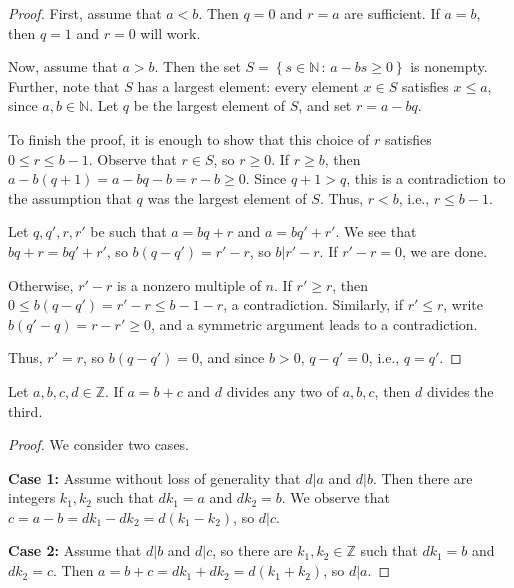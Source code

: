 \documentclass[english,course]{lecture}
\renewcommand{\le}{\leqslant}
\renewcommand{\ge}{\geqslant}
\theoremstyle{plain}
\def\setof#1#2{{\left\{#1\,\colon\,#2\right\}}}
\def\Z{{\mathbb Z}}
\def\N{{\mathbb N}}
\def\presnotes{}
\begin{document}
\begin{proof}
First, assume that $a < b$.
	Then $q = 0$ and $r = a$ are sufficient.
	If $a = b$, then $q = 1$ and $r = 0$ will work.
	
	Now, assume that $a > b$.
	Then the set $S = \setof{s\in\N}{a-bs \ge 0}$ is nonempty.
	Further, note that $S$ has a largest element: every element $x\in S$ satisfies $x \le a$, since $a,b\in\N$.
	Let $q$ be the largest element of $S$, and set $r = a - bq$.
	
	To finish the proof, it is enough to show that this choice of $r$ satisfies $0\le r \le b-1$.
	Observe that $r\in S$, so $r\ge 0$.
	If $r \ge b$, then $a - b(q+1) = a-bq -b = r -b \ge 0$.
	Since $q+1 > q$, this is a contradiction to the assumption that $q$ was the largest element of $S$.
	Thus, $r < b$, i.e., $r \le b-1$.
	
	\medskip
	
	Let $q,q',r,r'$ be such that $a = bq+r$ and $a=bq'+r'$.
	We see that $bq+r = bq' + r'$, so $b(q-q') = r'-r$, so $b|r'-r$.
	If $r'-r = 0$, we are done.
	
	Otherwise, $r'-r$ is a nonzero multiple of $n$.
	If $r' \ge r$, then $0\le b(q-q') = r' - r \le b-1 - r$, a contradiction.
	Similarly, if $r' \le r$, write $b(q'-q) = r-r' \ge 0$, and a symmetric argument leads to a contradiction.
	
	Thus, $r' = r$, so $b(q-q') = 0$, and since $b > 0$, $q - q'= 0$, i.e., $q = q'$.
\end{proof}


\presnotes


\begin{theorem}\label{theorem:23lemmageneralization}
	Let $a,b,c,d\in \Z$.
	If $a = b+c$ and $d$ divides any two of $a,b,c$, then $d$ divides the third.
\end{theorem}%

\begin{proof}
	We consider two cases.
	
	\textbf{Case 1:} Assume without loss of generality that $d|a$ and $d|b$.
	Then there are integers $k_1, k_2$ such that $d k_1 = a$ and $d k_2 = b$.
	We observe that $c = a - b = d k_1 - d k_2 = d(k_1 - k_2)$, so $d|c$.
	
	\textbf{Case 2:} Assume that $d| b$ and $d|c$, so there are $k_1,k_2\in \Z$ such that $d k_1 = b$ and $d k_2 = c$.
	Then $a = b+ c = dk_1 + dk_2 = d(k_1 + k_2)$, so $d|a$.
\end{proof}
\end{document}
